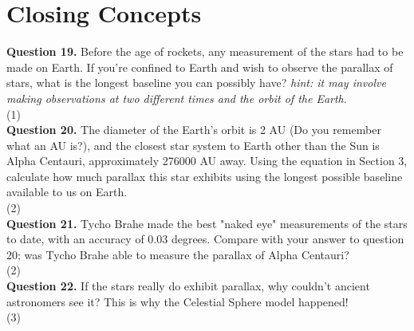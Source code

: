 \documentclass[11pt]{article}
\begin{document}
\newpage

\section{Closing Concepts}
\textbf{Question 19.} Before the age of rockets, any measurement of the stars had to be made on Earth. If you're confined to Earth and wish to observe the parallax of stars, what is the longest baseline you can possibly have? \textit{hint: it may involve making observations at two different times and the orbit of the Earth}.\\

\vspace{1.5cm}
(1) \hrulefill\\

\textbf{Question 20.} The diameter of the Earth's orbit is 2 AU (Do you remember what an AU is?), and the closest star system to Earth other than the Sun is Alpha Centauri, approximately 276000 AU away. Using the equation in Section 3, calculate how much parallax this star exhibits using the longest possible baseline available to us on Earth.\\

\vspace{1.5cm}
(2) \hrulefill\\

\textbf{Question 21.} Tycho Brahe made the best "naked eye" measurements of the stars to date, with an accuracy of 0.03 degrees. Compare with your answer to question 20; was Tycho Brahe able to measure the parallax of Alpha Centauri?\\

\vspace{1.5cm}
(2) \hrulefill\\

\textbf{Question 22.} If the stars really do exhibit parallax, why couldn't ancient astronomers see it? This is why the Celestial Sphere model happened!\\

\vspace{1.5cm}
(3) \hrulefill\\
\end{document}

